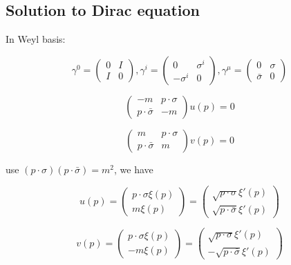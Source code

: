 \documentclass[12pt]{book}
\begin{document}
\subsection{Solution to Dirac equation}
In Weyl basis:

\begin{equation}
	\gamma^0=\begin{pmatrix}
		0&I\\
		I&0
	\end{pmatrix},
	\gamma^i=\begin{pmatrix}
		0&\sigma^i\\
		-\sigma^i&0
	\end{pmatrix},
	\gamma^\mu=\begin{pmatrix}
		0&\sigma\\
		\bar\sigma&0
	\end{pmatrix}
\end{equation}

\begin{equation}
	\begin{pmatrix}
		-m&p\cdot\sigma\\
		p\cdot\bar\sigma&-m
	\end{pmatrix}
	u(p)=0
\end{equation}

\begin{equation}
	\begin{pmatrix}
		m&p\cdot\sigma\\
		p\cdot\bar\sigma&m
	\end{pmatrix}
	v(p)=0
\end{equation}

use $(p\cdot\sigma)(p\cdot\bar\sigma)=m^2$, we have

\begin{equation}
	u(p)=\begin{pmatrix}
		p\cdot\sigma \xi(p)\\
		m\xi(p)
	\end{pmatrix}=\begin{pmatrix}
		\sqrt{p\cdot\sigma} \xi'(p)\\
		\sqrt{p\cdot\bar\sigma} \xi'(p)
	\end{pmatrix}
\end{equation}

\begin{equation}
	v(p)=\begin{pmatrix}
		p\cdot\sigma \xi(p)\\
		-m\xi(p)
	\end{pmatrix}=\begin{pmatrix}
		\sqrt{p\cdot\sigma} \xi'(p)\\
		-\sqrt{p\cdot\bar\sigma} \xi'(p)
	\end{pmatrix}
\end{equation}
\end{document}
